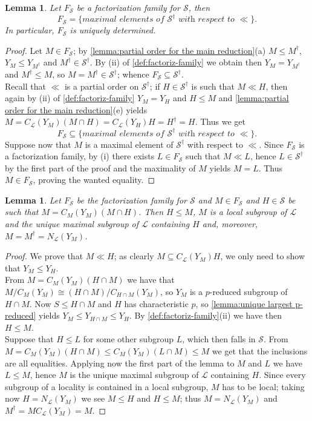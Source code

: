 \documentclass{amsart}
\numberwithin{equation}{section}
\newtheorem{lemma}[equation]{Lemma}
\theoremstyle{definition}
\theoremstyle{subresult}
\theoremstyle{caseresult}
\renewcommand{\L}{\mathcal{L}}
\renewcommand{\S}{\mathcal{S}}
\newcommand{\<}{\langle}
\renewcommand{\>}{\rangle}
\begin{document}
\begin{lemma}\label{lemma:unique-factor-family}
Let $F_\S$ be a factorization family for $\S$, then
\[
    F_\S = \{ \textit{maximal elements of $\S^\dagger$ with respect to $\ll$} \}.
\]
In particular, $F_\S$ is uniquely determined.
\end{lemma}
\begin{proof}
Let $M \in F_\S$; by \ref{lemma:partial order for the main reduction}(a) $M \le M^\dagger$, $Y_M \le Y_{M^\dagger}$ and $M^\dagger \in \S^\dagger$. By (ii) of \ref{def:factoriz-family} we obtain then $Y_M = Y_{M^\dagger}$ and $M^\dagger \le M$,  so $M=M^\dagger \in \S^\dagger$; whence $F_\S \subseteq \S^\dagger$.\\
Recall that $\ll$ is a partial order on $\S^\dagger$; if $H \in \S^\dagger$ is such that $M \ll H$, then again by (ii) of \ref{def:factoriz-family} $Y_M = Y_H$ and $H \le M$ and \ref{lemma:partial order for the main reduction}(e) yields $M = C_\L(Y_M)(M \cap H) = C_\L(Y_H)H=H^\dagger=H$. Thus we get
\[
F_\S \subseteq \{ \textit{maximal elements of $\S^\dagger$ with respect to $\ll$} \}.
\]
Suppose now that $M$ is a maximal element of $\S^\dagger$ with respect to $\ll$. Since $F_\S$ is a factorization family, by (i) there exists $L \in F_\S$ such that $M \ll L$, hence $L \in \S^\dagger$ by the first part of the proof and the maximality of $M$ yields $M = L$. Thus $M \in F_\S$, proving the wanted equality.
\end{proof}

\begin{lemma}\label{lemma:M in factorization family is local}
    Let $F_\S$ be the factorization family for $\S$ and $M \in F_\S$ and $H \in \S$ be such that $M=C_M(Y_M)(M \cap H)$. Then $H \le M$, $M$ is a local subgroup of $\L$ and the unique maximal subgroup of $\L$ containing $H$ and, moreover, $M=M^\dagger=N_\L(Y_M)$. 
\end{lemma}
\begin{proof}
We prove that $M \ll H$; as clearly $M \subseteq C_\L(Y_M)H$, we only need to show that $Y_M \le Y_H$.\\
From $M=C_M(Y_M)(H\cap M)$ we have that $M/C_M(Y_M) \cong (H \cap M)/C_{H\cap M}(Y_M)$, so $Y_M$ is a $p$-reduced subgroup of $H \cap M$. Now $S \le H \cap M$ and $H$ has characteristic $p$, so \ref{lemma:unique largest p-reduced} yields $Y_M \le Y_{H \cap M} \le Y_H$. By \ref{def:factoriz-family}(ii) we have then $H \le M$.\\
Suppose that $H \le L$ for some other subgroup $L$, which then falls in $\S$. From $M = C_M(Y_M)(H \cap M) \le C_M(Y_M)(L \cap M) \le M$ we get that the inclusions are all equalities. Applying now the first part of the lemma to $M$ and $L$ we have $L \le M$, hence $M$ is the unique maximal subgroup of $\L$ containing $H$. Since every subgroup of a locality is contained in a local subgroup, $M$ has to be local; taking now $H=N_\L(Y_M)$ we see $M \le H$ and $H \le M$; thus $M=N_\L(Y_M)$ and $M^\dagger = M C_\L(Y_M) = M$.
\end{proof}
\end{document}
